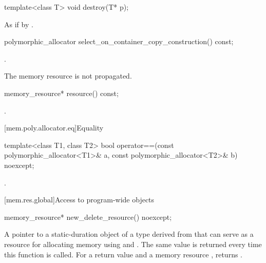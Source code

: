 %
\begin{itemdecl}
template<class T>
  void destroy(T* p);
\end{itemdecl}

\begin{itemdescr}
\pnum
\effects
As if by .
\end{itemdescr}

%
\begin{itemdecl}
polymorphic_allocator select_on_container_copy_construction() const;
\end{itemdecl}

\begin{itemdescr}
\pnum
\returns
{}.

\pnum
\begin{note}
The memory resource is not propagated.
\end{note}
\end{itemdescr}

%
\begin{itemdecl}
memory_resource* resource() const;
\end{itemdecl}

\begin{itemdescr}
\pnum
\returns
{}.
\end{itemdescr}

[mem.poly.allocator.eq]{Equality}

%
\begin{itemdecl}
template<class T1, class T2>
  bool operator==(const polymorphic_allocator<T1>& a,
                  const polymorphic_allocator<T2>& b) noexcept;
\end{itemdecl}

\begin{itemdescr}
\pnum
\returns
{}.
\end{itemdescr}

[mem.res.global]{Access to program-wide  objects}

%
\begin{itemdecl}
memory_resource* new_delete_resource() noexcept;
\end{itemdecl}

\begin{itemdescr}
\pnum
\returns
A pointer to a static-duration object of a type derived from 
that can serve as a resource for allocating memory
using  and .
The same value is returned every time this function is called.
For a return value  and a memory resource ,
 returns .
\end{itemdescr}

